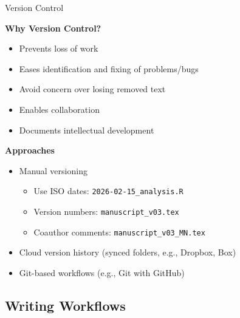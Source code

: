 \documentclass{beamer}
\begin{document}
\begin{frame}{Version Control}

\textbf{Why Version Control?}
\begin{itemize}
    \item Prevents loss of work
    \item Eases identification and fixing of problems/bugs
    \item Avoid concern over losing removed text
    \item Enables collaboration
    \item Documents intellectual development
\end{itemize}


\textbf{Approaches}
\begin{itemize}
    \item Manual versioning 
        \begin{itemize}
            \item Use ISO dates: \texttt{2026-02-15\_analysis.R}
            \item Version numbers: \texttt{manuscript\_v03.tex}
            \item Coauthor comments: \texttt{manuscript\_v03\_MN.tex}
        \end{itemize}
    \item Cloud version history (synced folders, e.g., Dropbox, Box)
    \item Git-based workflows (e.g., Git with GitHub)
\end{itemize}


\end{frame}

\subsection{Writing Workflows}
\end{document}
